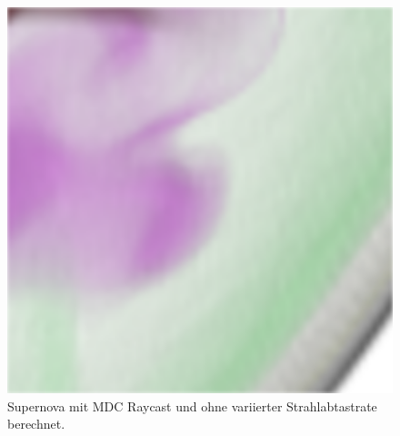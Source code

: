 \begin{figure}[]
\begin{minipage}[t]{0.3\textwidth}
	\end{minipage}
	\hfill
	\begin{minipage}[t]{0.3\textwidth}
		\centering
		\includegraphics[width=1\textwidth]{../../Neue_Messungen/Supernova/cut/mdc/mdc_3.png}
	\end{minipage}
	\caption{Supernova mit MDC Raycast und ohne variierter Strahlabtastrate berechnet.}
	\label{fig::res::sn_comp_mdc}
\end{figure}

